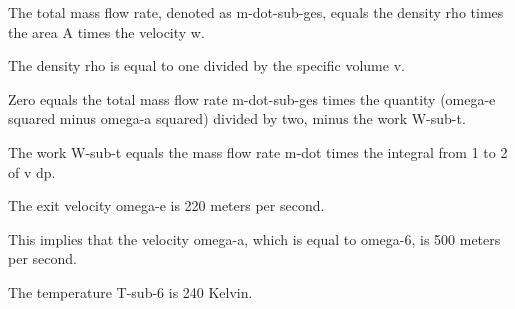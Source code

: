 The total mass flow rate, denoted as m-dot-sub-ges, equals the density rho times the area A times the velocity w.

The density rho is equal to one divided by the specific volume v.

Zero equals the total mass flow rate m-dot-sub-ges times the quantity (omega-e squared minus omega-a squared) divided by two, minus the work W-sub-t.

The work W-sub-t equals the mass flow rate m-dot times the integral from 1 to 2 of v dp.

The exit velocity omega-e is 220 meters per second.

This implies that the velocity omega-a, which is equal to omega-6, is 500 meters per second.

The temperature T-sub-6 is 240 Kelvin.